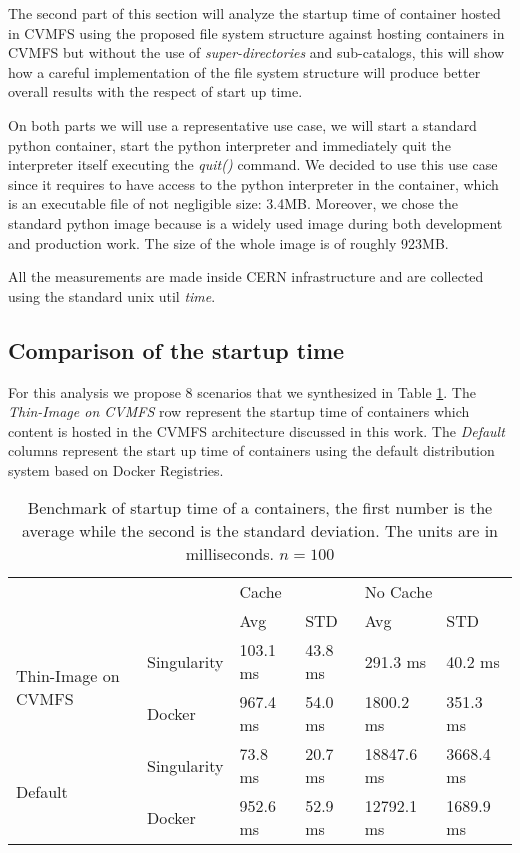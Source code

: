 The second part of this section will analyze the startup time of container
hosted in CVMFS using the proposed file system structure against hosting
containers in CVMFS but without the use of \textit{super-directories} and
sub-catalogs, this will show how a careful implementation of the file system
structure will produce better overall results with the respect of start up time.

On both parts we will use a representative use case, we will start a standard
python container, start the python interpreter and immediately quit the
interpreter itself executing the \textit{quit()} command. We decided to use this
use case since it requires to have access to the python interpreter in the
container, which is an executable file of not negligible size: 3.4MB. Moreover, we 
chose the standard python image because is a widely used image during both
development and production work. The size of the whole image is of roughly 923MB.

All the measurements are made inside CERN infrastructure and are collected
using the standard unix util \textit{time}.

\subsection{Comparison of the startup time}

For this analysis we propose 8 scenarios that we synthesized in Table
\ref{tab:benchmark}. The \textit{Thin-Image on CVMFS} row represent the startup
time of containers which content is hosted in the CVMFS architecture discussed
in this work. The \textit{Default} columns represent the start up time of
containers using the default distribution system based on Docker Registries.

\begin{table}[h]
\begin{tabular}{|l|l|l|l|l|l|}
\hline
\multicolumn{2}{|l|}{\multirow{2}{*}{}}            & \multicolumn{2}{l|}{Cache} & \multicolumn{2}{l|}{No Cache} \\ \cline{3-6} 
\multicolumn{2}{|l|}{}                             & Avg          & STD         & Avg            & STD          \\ \hline \hline
\multirow{2}{*}{Thin-Image on CVMFS} & Singularity & 103.1 ms        & 43.8   ms   & 291.3  ms      & 40.2 ms        \\ \cline{2-6} 
                                     & Docker      & 967.4 ms       & 54.0  ms      & 1800.2 ms        & 351.3 ms  \\ \hline \hline
\multirow{2}{*}{Default}               & Singularity & 73.8 ms        & 20.7 ms       & 18847.6  ms      & 3668.4 ms      \\ \cline{2-6} 
                                     & Docker      & 952.6 ms       & 52.9 ms       & 12792.1  ms      & 1689.9 ms      \\ \hline
\end{tabular}
\caption{Benchmark of startup time of a containers, the first number is the average while the second is the standard deviation. The units are in milliseconds. $n = 100$}
\label{tab:benchmark}
\end{table}

